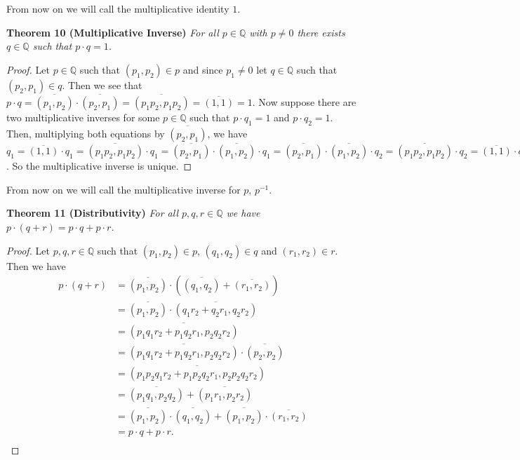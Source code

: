 \documentclass{article}
\begin{document}
\begin{flushleft}
From now on we will call the multiplicative identity $1$.\newline

\textbf{Theorem 10 (Multiplicative Inverse)}
\textsl{For all $p \in \mathbb{Q}$ with $p \neq 0$ there exists $q \in \mathbb{Q}$ such that $p \cdot q=1$.}
\begin{proof}
Let $p \in \mathbb{Q}$ such that $(p_1,p_2) \in p$ and since $p_1 \neq 0$ let $q \in \mathbb{Q}$ such that $(p_2,p_1) \in q$. Then we see that $p \cdot q = \overline{(p_1,p_2)} \cdot \overline{(p_2,p_1)} = \overline{(p_1p_2,p_1p_2)}=\overline{(1,1)}=1$. Now suppose there are two multiplicative inverses for some $p \in \mathbb{Q}$ such that $p \cdot q_1=1$ and $p \cdot q_2=1$. Then, multiplying both equations by $\overline{(p_2,p_1)}$, we have $q_1=\overline{(1,1)} \cdot q_1=\overline{(p_1p_2,p_1p_2)} \cdot q_1=\overline{(p_2,p_1)} \cdot \overline{(p_1,p_2)} \cdot q_1=\overline{(p_2,p_1)} \cdot \overline{(p_1,p_2)} \cdot q_2=\overline{(p_1p_2,p_1p_2)} \cdot q_2=\overline{(1,1)} \cdot q_2=q_2$. So the multiplicative inverse is unique.
\end{proof}

From now on we will call the multiplicative inverse for $p$, $p^{-1}$.\newline

\textbf{Theorem 11 (Distributivity)}
\textsl{For all $p,q,r \in \mathbb{Q}$ we have $p \cdot (q+r)=p \cdot q + p \cdot r$.}
\begin{proof}
Let $p,q,r \in \mathbb{Q}$ such that $(p_1,p_2) \in p$, $(q_1,q_2) \in q$ and $(r_1,r_2) \in r$. Then we have
\begin{align*}
p \cdot (q+r) &= \overline{(p_1,p_2)} \cdot \left(\overline{(q_1,q_2)} + \overline{(r_1,r_2)}\right) \\
			   &= \overline{(p_1,p_2)} \cdot \overline{(q_1r_2+q_2r_1,q_2r_2)}\\
			   &= \overline{(p_1q_1r_2+p_1q_2r_1,p_2q_2r_2)} \\
			   &= \overline{(p_1q_1r_2+p_1q_2r_1,p_2q_2r_2)} \cdot \overline{(p_2,p_2)} \\
			   &= \overline{(p_1p_2q_1r_2+p_1p_2q_2r_1,p_2p_2q_2r_2)} \\
			   &= \overline{(p_1q_1,p_2q_2)} + \overline{(p_1r_1,p_2r_2)} \\
			   &= \overline{(p_1,p_2)} \cdot \overline{(q_1,q_2)} + \overline{(p_1,p_2)} \cdot \overline{(r_1,r_2)} \\
			   &= p \cdot q + p \cdot r. \\
\end{align*}
\end{proof}


\end{flushleft}
\end{document}
